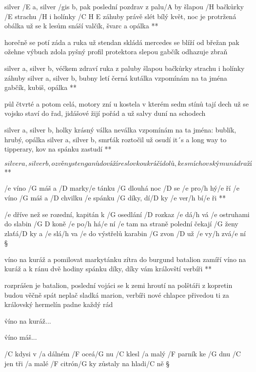 \R silver /E a, silver /gis b, pak poslední pozdrav z palu/A by
   šlapou /H bačkůrky /E strachu /H i holínky /{C H E} záhuby
   právě slét bílý květ, noc je protržená obálka
   už se k lesům snáší valčík, švarc a opálka **

horečně se potí záda a ruka už stendan skládá
mercedes se blíží od břežan
pak ožehne výbuch zdola pyšný profil protektora
slepou gabčík odhazuje zbraň \s

\R silver a, silver b, véčkem zdraví ruka z paluby
   šlapou bačkůrky strachu i holínky záhuby
   silver a, silver b, bubny letí černá kutálka
   vzpomínám na ta jména gabčík, kubiš, opálka **

půl čtvrté a potom celá, motory zní u kostela
v kterém sedm stínů tají dech
už se vojsko staví do řad, jidášové žijí pořád
a už salvy duní na schodech \s

\R silver a, silver b, holky krásný válka neválka
   vzpomínám na ta jména: bublík, hrubý, opálka
   silver a, silver b, smrťák roztočil už osudí
   it´s a long way to tipperary, kov na spánku zastudí **

\R \[ silver a, silver b, ozvěny stenganů dováží
   reslovkou kráčí dolů, ke smíchovskýmu nádraží \] **




\R  /e víno /G máš a /D marky/e tánku
    /G dlouhá noc /D se /e pro/h hý/e ří
   /e víno /G máš a /D chvilku /e spánku
    /G díky, dí/D ky /e ver/h bí/e ři **

/e dříve než se rozední, kapitán k /G osedlání /D rozkaz /e dá/h vá
/e ostruhami do slabin /{G D} koně /e po/h há/e ní
/e tam na straně polední čekají /G ženy zlaťá/D ky a /e slá/h va
/e do výstřelů karabin /G zvon /D už /e vy/h zvá/e ní \S

\R víno na kuráž a pomilovat markytánku
   zítra do burgund batalion zamíří
   víno na kuráž a k ránu dvě hodiny spánku
   díky, díky vám královští verbíři **

rozprášen je batalion, poslední vojáci se k zemi hroutí
na polštáři z kopretin budou věčně spát
neplač sladká marion, verbíři nové chlapce přivedou ti
za královský hermelín padne každý rád \s

\r víno na kuráž...

\r víno máš...




/C kdysi v /a dálném /F oceá/G nu
/C klesl /a malý /F parník ke /G dnu
/C jen tři /a malé /F citrón/G ky
zůstaly na hladi/C ně \S


